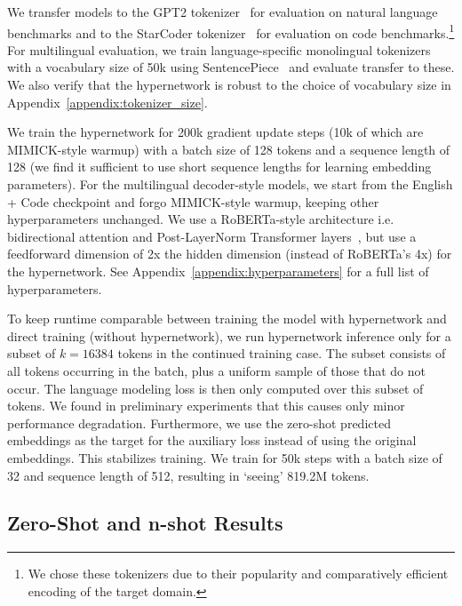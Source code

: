 \documentclass{article}
\begin{document}
 We transfer models to the GPT2 tokenizer~\citep{radford2019language} for evaluation on natural language benchmarks and to the StarCoder tokenizer~\citep{li2023starcoder} for evaluation on code benchmarks.\footnote{We chose these tokenizers due to their popularity and comparatively efficient encoding of the target domain.} For multilingual evaluation, we train language-specific monolingual tokenizers with a vocabulary size of 50k using SentencePiece~\citep{kudo-richardson-2018-sentencepiece} and evaluate transfer to these. We also verify that the hypernetwork is robust to the choice of vocabulary size in Appendix~\ref{appendix:tokenizer_size}.




 We train the hypernetwork for 200k gradient update steps (10k of which are MIMICK-style warmup) with a batch size of 128 tokens and a sequence length of 128 (we find it sufficient to use short sequence lengths for learning embedding parameters). For the multilingual decoder-style models, we start from the English + Code checkpoint and forgo MIMICK-style warmup, keeping other hyperparameters unchanged. We use a RoBERTa-style architecture i.e. bidirectional attention and Post-LayerNorm Transformer layers~\citep{liu2019roberta}, but use a feedforward dimension of 2x the hidden dimension (instead of RoBERTa's 4x) for the hypernetwork. See Appendix~\ref{appendix:hyperparameters} for a full list of hyperparameters.

 To keep runtime comparable between training the model with hypernetwork and direct training (without hypernetwork), we run hypernetwork inference only for a subset of $k=16384$ tokens in the continued training case. The subset consists of all tokens occurring in the batch, plus a uniform sample of those that do not occur. The language modeling loss is then only computed over this subset of tokens. We found in preliminary experiments that this causes only minor performance degradation. Furthermore, we use the zero-shot predicted embeddings as the target for the auxiliary loss instead of using the original embeddings. This stabilizes training. We train for 50k steps with a batch size of 32 and sequence length of 512, resulting in `seeing' 819.2M tokens.

\subsection{Zero-Shot and n-shot Results}
\label{subsec:results}
\end{document}
